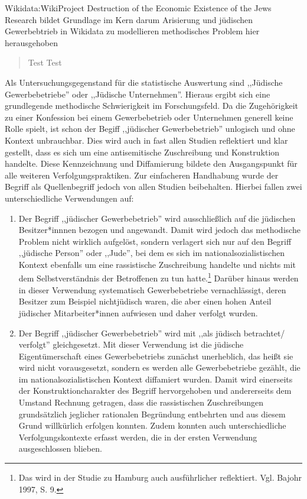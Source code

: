 Wikidata:WikiProject Destruction of the Economic Existence of the Jews Research bildet Grundlage
im Kern darum Arisierung und jüdischen Gewerbebtrieb in Wikidata zu modellieren
methodisches Problem hier herausgehoben

\begin{quotation}
    Test Test
    
\end{quotation}



Als Untersuchungsgegenstand für die statistische Auswertung sind ,,Jüdische Gewerbebetriebe'' oder ,,Jüdische Unternehmen''. Hieraus ergibt sich eine grundlegende methodische Schwierigkeit im Forschungsfeld. Da die Zugehörigkeit zu einer Konfession bei einem Gewerbebetrieb oder Unternehmen generell keine Rolle spielt, ist schon der Begiff ,,jüdischer Gewerbebetrieb'' unlogisch und ohne Kontext unbrauchbar. Dies wird auch in fast allen Studien reflektiert und klar gestellt, dass es sich um eine antisemitische Zuschreibung und Konstruktion handelte. Diese Kennzeichnung und Diffamierung bildete den Ausgangspunkt für alle weiteren Verfolgungspraktiken. Zur einfacheren Handhabung wurde der Begriff als Quellenbegriff jedoch von allen Studien beibehalten. Hierbei fallen zwei unterschiedliche Verwendungen auf: 

\begin{enumerate}
    \item Der Begriff ,,jüdischer Gewerbebetrieb'' wird ausschließlich auf die jüdischen Besitzer*innnen bezogen und angewandt. Damit wird jedoch das methodische Problem nicht wirklich aufgelöst, sondern verlagert sich nur auf den Begriff ,,jüdische Person'' oder ,,Jude'', bei dem es sich im nationalsozialistischen Kontext ebenfalls um eine rassistische Zuschreibung handelte und nichts mit dem Selbstverständnis der Betroffenen zu tun hatte.\footnote{Das wird in der Studie zu Hamburg auch ausführlicher reflektiert. Vgl. Bajohr 1997, S. 9.} Darüber hinaus werden in dieser Verwendung systematisch Gewerbebetriebe vernachlässigt, deren Besitzer zum Beispiel nichtjüdisch waren, die aber einen hohen Anteil jüdischer Mitarbeiter*innen aufwiesen und daher verfolgt wurden. 
    \item Der Begriff ,,jüdischer Gewerbebetrieb'' wird mit ,,als jüdisch betrachtet/ verfolgt'' gleichgesetzt. Mit dieser Verwendung ist die jüdische Eigentümerschaft eines Gewerbebetriebs zunächst unerheblich, das heißt sie wird nicht vorausgesetzt, sondern es werden alle Gewerbebetriebe gezählt, die im nationalsozialistischen Kontext diffamiert wurden. Damit wird einerseits der Konstruktioncharakter des Begriff hervorgehoben und andererseits dem Umstand Rechnung getragen, dass die rassistischen Zuschreibungen grundsätzlich jeglicher rationalen Begründung entbehrten und aus diesem Grund willkürlich erfolgen konnten. Zudem konnten auch unterschiedliche Verfolgungskontexte erfasst werden, die in der ersten Verwendung ausgeschlossen blieben.
\end{enumerate}

